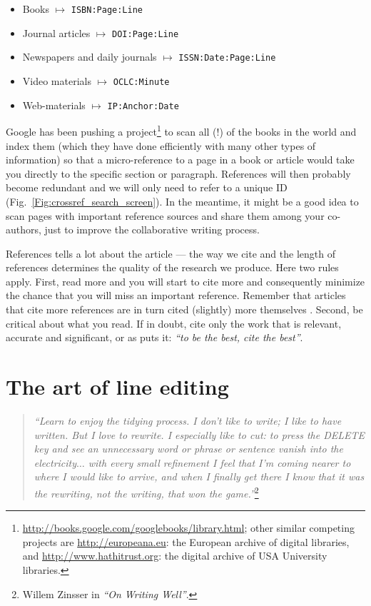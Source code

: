 \documentclass[graybox,envcountchap,sectrefs,UStrade]{svmono}
\begin{document}
\begin{itemize}
  \item Books $\mapsto$ \texttt{ISBN:Page:Line}
  \item Journal articles $\mapsto$ \texttt{DOI:Page:Line}
  \item Newspapers and daily journals $\mapsto$ \texttt{ISSN:Date:Page:Line}
  \item Video materials $\mapsto$ \texttt{OCLC:Minute}
  \item Web-materials $\mapsto$ \texttt{IP:Anchor:Date}
\end{itemize}

Google has been pushing a project\footnote{\url{http://books.google.com/googlebooks/library.html}; other similar competing projects are \url{http://europeana.eu}: the European archive of digital libraries, and \url{http://www.hathitrust.org}: the digital archive of USA University libraries.} to scan all (!) of the books in the world and index them (which they have done efficiently with many other types of information) so that a micro-reference to a page in a book or article would take you directly to the specific section or paragraph. References will then probably become redundant and we will only need to refer to a unique ID (Fig.\@~\ref{Fig:crossref_search_screen}). In the meantime, it might be a good idea to scan pages with important reference sources and share them among your co-authors, just to improve the collaborative writing process.\par

References tells a lot about the article --- the way we cite and the length of references determines the quality of the research we produce. Here two rules apply. First, read more and you will start to cite more and consequently minimize the chance that you will miss an important reference. Remember that articles that cite more references are in turn cited (slightly) more themselves \citep{Webster2009}. Second, be critical about what you read. If in doubt, cite only the work that is relevant, accurate and significant, or as \citet{Corbyn2010} puts it: \emph{``to be the best, cite the best''}.\par


 \section{The art of line editing}

\begin{quote}
    \emph{``Learn to enjoy the tidying process. I don't like to write; I like to have written. But I love to rewrite. I especially like to cut: to press the DELETE key and see an unnecessary word or phrase or sentence vanish into the electricity$\ldots$ with every small refinement I feel that I'm coming nearer to where I would like to arrive, and when I finally get there I know that it was the rewriting, not the writing, that won the game.''}\footnote{Willem Zinsser in \emph{``On Writing Well''}.}
\end{quote}
\end{document}
